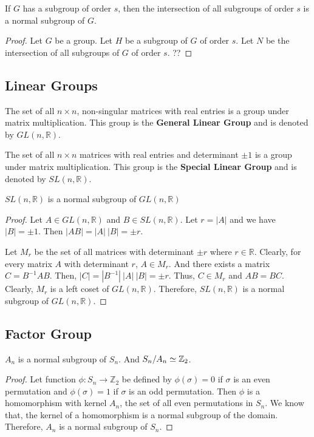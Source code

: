 \begin{remark}
	If $G$ has a subgroup of order $s$, then the intersection of all subgroups of order $s$ is a normal subgroup of $G$.%
\end{remark}
\begin{proof}
	Let $G$ be a group. Let $H$ be a subgroup of $G$ of order $s$. Let $N$ be the intersection of all subgroups of $G$ of order $s$. ??
\end{proof}

\subsection{Linear Groups}
\begin{definition}
	The set of all $n \times n$, non-singular matrices with real entries is a group under matrix multiplication. This group is the \textbf{General Linear Group} and is denoted by $GL(n,\mathbb{R})$.
\end{definition}

\begin{definition}
	The set of all $n \times n$ matrices with real entries and determinant $\pm 1$ is a group under matrix multiplication. This group is the \textbf{Special Linear Group} and is denoted by $SL(n,\mathbb{R})$.
\end{definition}

\begin{remark}
	$SL(n,\mathbb{R})$ is a normal subgroup of $GL(n,\mathbb{R})$%
\end{remark}
\begin{proof}
	Let $A \in GL(n,\mathbb{R})$ and $B \in SL(n,\mathbb{R})$. Let $r = |A|$ and we have $|B| = \pm 1$. Then $|AB| = |A|\ |B| = \pm r$.

	Let $M_r$ be the set of all matrices with determinant $\pm r$ where $r \in \mathbb{R}$. Clearly, for every matrix $A$ with determinant $r$, $A \in M_r$. And there exists a matrix $C = B^{-1}AB$. Then, $|C| = |B^{-1}|\ |A|\ |B| = \pm r$. Thus, $C \in M_r$ and $AB = BC$. Clearly, $M_r$ is a left coset of $GL(n,\mathbb{R})$. Therefore, $SL(n,\mathbb{R})$ is a normal subgroup of $GL(n,\mathbb{R})$.
\end{proof}

\subsection{Factor Group}
\begin{remark}
	$A_n$ is a normal subgroup of $S_n$.
	And $S_n/A_n \simeq \mathbb{Z}_2$.%
\end{remark}
\begin{proof}
	Let function $\phi : S_n \to \mathbb{Z}_2$ be defined by $\phi(\sigma) = 0$ if $\sigma$ is an even permutation and $\phi(\sigma) = 1$ if $\sigma$ is an odd permutation. Then $\phi$ is a homomorphism with kernel $A_n$, the set of all even permutations in $S_n$. We know that, the kernel of a homomorphism is a normal subgroup of the domain. Therefore, $A_n$ is a normal subgroup of $S_n$.
\end{proof}

